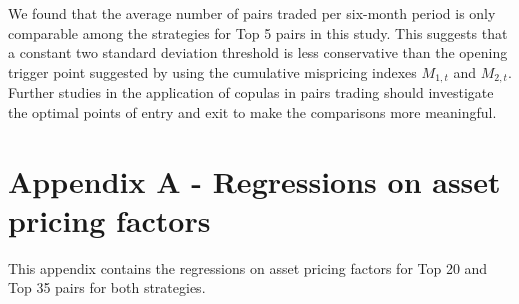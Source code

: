 \documentclass[a4paper]{article}
\begin{document}
\vspace{0.3cm}

We found that the average number of pairs traded per six-month period is only comparable among the strategies for Top 5 pairs in this study. This suggests that a constant two standard deviation threshold \citep{ggr06} is less conservative than the opening trigger point suggested by \citet*{rf15} using the cumulative mispricing indexes $M_{1,t}$ and $M_{2,t}$. Further studies in the application of copulas in pairs trading should investigate the optimal points of entry and exit to make the comparisons more meaningful.


	\newpage
	
	\section*{Appendix A - Regressions on asset pricing factors}
	
	\vspace{0.6cm}
	
	\setcounter{table}{0}
	\renewcommand{\thetable}{A.\arabic{table}}
	
	
	This appendix contains the regressions on asset pricing factors for Top 20 and Top 35 pairs for both strategies.
	
	\vspace{1.0cm}
	
\end{document}

